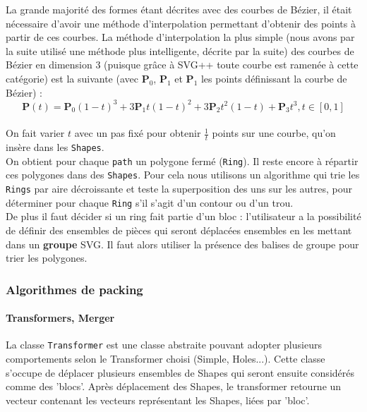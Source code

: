 
La grande majorité des formes étant décrites avec des courbes de Bézier, il était nécessaire d'avoir une méthode d'interpolation permettant d'obtenir des points à partir de ces courbes. La méthode d'interpolation la plus simple (nous avons par la suite utilisé une méthode plus intelligente, décrite par la suite) des courbes de Bézier en dimension 3 (puisque grâce à SVG++ toute courbe est ramenée à cette catégorie) est la suivante (avec ${\mathbf  {P}}_{0}$, ${\mathbf  {P}}_{1}$ et ${\mathbf  {P}}_{1}$ les points définissant la courbe de Bézier) :
$${\mathbf  {P}}(t)={\mathbf  {P}}_{0}(1-t)^{3}+3{\mathbf  {P}}_{1}t(1-t)^{2}+3{\mathbf  {P}}_{2}t^{2}(1-t)+{\mathbf  {P}}_{3}t^{3}, t \in [0, 1]$$\\
On fait varier $t$ avec un pas fixé pour obtenir $\frac{1}{t}$ points sur une courbe, qu'on insère dans les \texttt{Shapes}.\\

On obtient pour chaque \texttt{path} un polygone fermé (\texttt{Ring}). Il reste encore à répartir ces polygones dans des \texttt{Shapes}. Pour cela nous utilisons un algorithme qui trie les \texttt{Rings} par aire décroissante et teste la superposition des uns sur les autres, pour déterminer pour chaque \texttt{Ring} s'il s'agit d'un contour ou d'un trou.\\

De plus il faut décider si un ring fait partie d'un bloc : l'utilisateur a la possibilité de définir des ensembles de pièces qui seront déplacées ensembles en les mettant dans un \textbf{groupe} SVG. Il faut alors utiliser la présence des balises de groupe pour trier les polygones.

\subsubsection{Algorithmes de packing}

\paragraph{Transformers, Merger\\}

La classe \texttt{Transformer} est une classe abstraite pouvant adopter plusieurs comportements selon le Transformer choisi (Simple, Holes...). 
Cette classe s'occupe de déplacer plusieurs ensembles de Shapes qui seront ensuite considérés comme des 'blocs'.
Après déplacement des Shapes, le transformer retourne un vecteur contenant les vecteurs représentant les Shapes, liées par 'bloc'.

